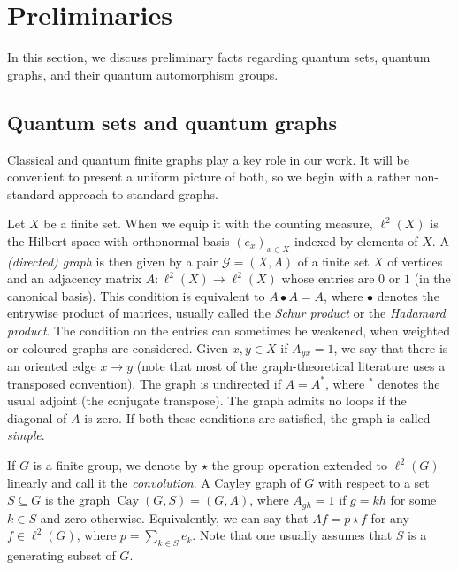 \documentclass[12pt]{amsart}
\theoremstyle{definition}
\theoremstyle{definition}
\theoremstyle{definition}
\theoremstyle{definition}
\DeclareMathOperator{\Cay}{Cay}
\newcommand{\Gr}{\mathcal{G}}
\numberwithin{equation}{section}
\begin{document}
\section{Preliminaries} \label{sec:prelims}

In this section, we discuss preliminary facts regarding quantum sets, quantum graphs, and their quantum automorphism groups.

\subsection{Quantum sets and quantum graphs}



Classical and quantum finite graphs play a key role in our work. It will be convenient to present a uniform picture of both, so we begin with a rather non-standard approach to standard graphs.

Let $X$ be a finite set. When we equip it with the counting measure,  $\ell^2(X)$ is the Hilbert space with orthonormal basis $(e_x)_{x\in X}$ indexed by elements of $X$.
A \emph{(directed) graph} is then given by a pair $\Gr=(X,A)$ of a finite set $X$ of vertices and an adjacency matrix $A\colon \ell^2(X)\to \ell^2(X)$  whose entries are $0$ or $1$ (in the canonical basis). This condition is equivalent to $A\bullet A=A$, where $\bullet$ denotes the entrywise product of matrices, usually called the \emph{Schur product} or the \emph{Hadamard product}. The condition on the entries can sometimes be weakened, when weighted or coloured graphs are considered. Given $x,y \in X$ if $A_{yx}=1$, we say that there is an oriented edge $x\to y$ (note that most of the graph-theoretical literature uses a transposed convention). The graph is undirected if $A=A^*$, where ${}^*$ denotes the usual adjoint (the conjugate transpose). The graph admits no loops if the diagonal of $A$ is zero. If both these conditions are satisfied, the graph is called \emph{simple}.

If $G$ is a finite group, we denote by $\star$ the group operation extended to $\ell^2(G)$ linearly and call it the \emph{convolution}. %
 A Cayley graph of $G$ with respect to a set  $S\subseteq G$ is the graph $\Cay(G,S)=(G,A)$, where $A_{gh}=1$ if $g=kh$ for some $k\in S$ and zero otherwise. Equivalently, we can say that $Af=p \star f$ for any $f\in \ell^2(G)$, where $p=\sum_{k\in S} e_k$. Note that one usually assumes that $S$ is a generating subset of $G$.
\end{document}

